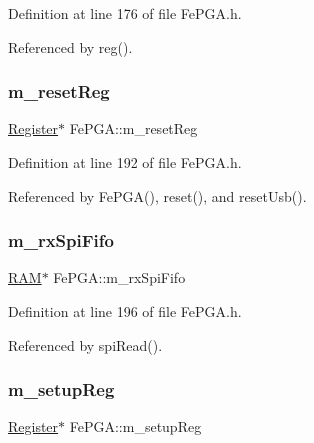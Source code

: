 Definition at line 176 of file Fe\+P\+G\+A.\+h.



Referenced by reg().

\mbox{\label{classFePGA_aeff1a2370237a06b50e1ae23d933c862}} 
\subsubsection{\texorpdfstring{m\+\_\+reset\+Reg}{m\_resetReg}}
{\footnotesize\ttfamily \hyperlink{classRegister}{Register}$\ast$ Fe\+P\+G\+A\+::m\+\_\+reset\+Reg\hspace{0.3cm}{\ttfamily [private]}}



Definition at line 192 of file Fe\+P\+G\+A.\+h.



Referenced by Fe\+P\+G\+A(), reset(), and reset\+Usb().

\mbox{\label{classFePGA_a3ee7f973bfad39b48bbc1a185e9ffaec}} 
\subsubsection{\texorpdfstring{m\+\_\+rx\+Spi\+Fifo}{m\_rxSpiFifo}}
{\footnotesize\ttfamily \hyperlink{classRAM}{R\+AM}$\ast$ Fe\+P\+G\+A\+::m\+\_\+rx\+Spi\+Fifo\hspace{0.3cm}{\ttfamily [private]}}



Definition at line 196 of file Fe\+P\+G\+A.\+h.



Referenced by spi\+Read().

\mbox{\label{classFePGA_a0255fe229013986b4387c3a75ddf4e97}} 
\subsubsection{\texorpdfstring{m\+\_\+setup\+Reg}{m\_setupReg}}
{\footnotesize\ttfamily \hyperlink{classRegister}{Register}$\ast$ Fe\+P\+G\+A\+::m\+\_\+setup\+Reg\hspace{0.3cm}{\ttfamily [private]}}



